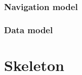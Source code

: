 \documentclass[11pt]{article}
\begin{document}
\subsubsection{Navigation model}

\subsubsection{Data model}

\section{Skeleton}
\end{document}
